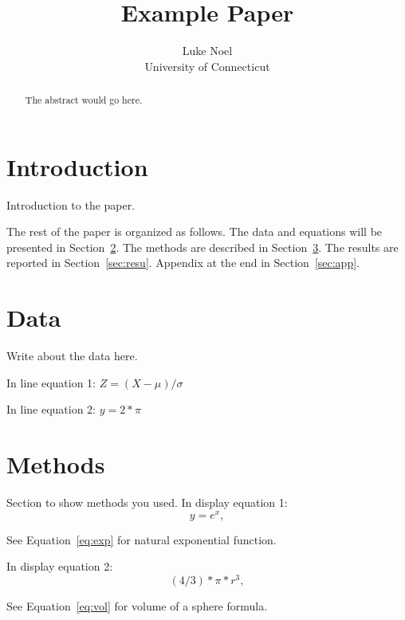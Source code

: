 \documentclass[12pt]{article}
\title{Example Paper}
\author{Luke Noel\\
  University of Connecticut
}
\begin{document}
\maketitle

\begin{abstract}
The abstract would go here. 
\end{abstract}

\section{Introduction}
\label{sec:intro}
Introduction to the paper.

The rest of the paper is organized as follows.
The data and equations will be presented in Section~\ref{sec:data}.
The methods are described in Section~\ref{sec:meth}.
The results are reported in Section~\ref{sec:resu}.
Appendix at the end in Section~\ref{sec:app}.

\section{Data}
\label{sec:data}

Write about the data here.

In line equation 1: $Z = (X - \mu)/\sigma$

In line equation 2: $y = 2*\pi$

\section{Methods}
\label{sec:meth}

Section to show methods you used. In display equation 1:
\begin{equation}
  \label{eq:exp}
  y = e^x,
\end{equation}

See Equation~\eqref{eq:exp} for natural exponential function.

In display equation 2:
\begin{equation}
  \label{eq:vol}
  (4/3)*\pi*r^3,
\end{equation}

See Equation~\eqref{eq:vol} for volume of a sphere formula.
\end{document}
